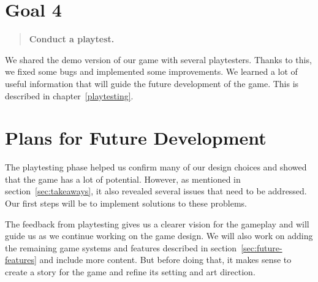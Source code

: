 \section{Goal 4}

\begin{quotation}
    \textbf{Conduct a playtest.}
\end{quotation}

We shared the demo version of our game with several playtesters.
Thanks to this, we fixed some bugs and implemented some improvements.
We learned a lot of useful information that will guide the future development of the game.
This is described in chapter~\ref{playtesting}.

\section{Plans for Future Development}

The playtesting phase helped us confirm many of our design choices and showed that the game has a lot of potential.
However, as mentioned in section~\ref{sec:takeaways}, it also revealed several issues that need to be addressed.
Our first steps will be to implement solutions to these problems.

The feedback from playtesting gives us a clearer vision for the gameplay and will guide us as we continue working on the game design.
We will also work on adding the remaining game systems and features described in section~\ref{sec:future-features} and include more content.
But before doing that, it makes sense to create a story for the game and refine its setting and art direction.